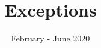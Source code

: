 \documentclass[]{slides}
\title{Exceptions}
\date{February - June 2020}
\begin{document}
\begin{frame} \titlepage \end{frame}

\end{document}
